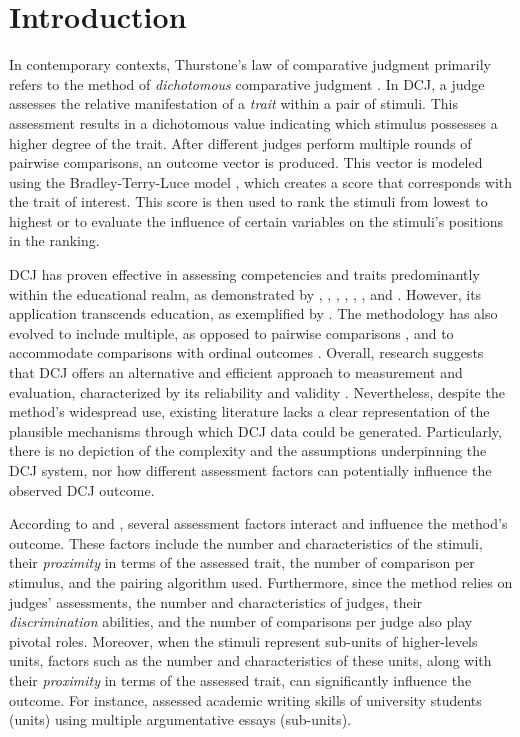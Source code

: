 \documentclass[
  authoryear,
  preprint,
  1p]{elsarticle}
\begin{document}
\section{Introduction}\label{sec-introduction}

In contemporary contexts, Thurstone's law of comparative judgment
\citeyearpar{Thurstone_1927} primarily refers to the method of
\emph{dichotomous} comparative judgment
\citep[DCJ,][]{Pollitt_2012a, Pollitt_2012b}. In DCJ, a judge assesses
the relative manifestation of a \emph{trait} within a pair of stimuli.
This assessment results in a dichotomous value indicating which stimulus
possesses a higher degree of the trait. After different judges perform
multiple rounds of pairwise comparisons, an outcome vector is produced.
This vector is modeled using the Bradley-Terry-Luce model
\citep[BTL,][]{Bradley_et_al_1952, Luce_1959}, which creates a score
that corresponds with the trait of interest. This score is then used to
rank the stimuli from lowest to highest or to evaluate the influence of
certain variables on the stimuli's positions in the ranking.

DCJ has proven effective in assessing competencies and traits
predominantly within the educational realm, as demonstrated by
\citet{Pollitt_2012b}, \citet{Jones_2015}, \citet{vanDaal_et_al_2016},
\citet{Bartholomew_et_al_2018}, \citet{Lesterhuis_2018},
\citet{Bartholomew_et_al_2020}, and \citet{Marshall_et_al_2020}.
However, its application transcends education, as exemplified by
\citet{Boonen_et_al_2020}. The methodology has also evolved to include
multiple, as opposed to pairwise comparisons
\citep{Luce_1959, Placket_1975}, and to accommodate comparisons with
ordinal outcomes \citep{Tutz_1986, Agresti_1992}. Overall, research
suggests that DCJ offers an alternative and efficient approach to
measurement and evaluation, characterized by its reliability and
validity
\citep{Lesterhuis_2018, vanDaal_2020, Marshall_et_al_2020, Bouwer_et_al_2023}.
Nevertheless, despite the method's widespread use, existing literature
lacks a clear representation of the plausible mechanisms through which
DCJ data could be generated. Particularly, there is no depiction of the
complexity and the assumptions underpinning the DCJ system, nor how
different assessment factors can potentially influence the observed DCJ
outcome.

According to \citet{Verhavert_et_al_2019} and \citet{vanDaal_2020},
several assessment factors interact and influence the method's outcome.
These factors include the number and characteristics of the stimuli,
their \emph{proximity} in terms of the assessed trait, the number of
comparison per stimulus, and the pairing algorithm used. Furthermore,
since the method relies on judges' assessments, the number and
characteristics of judges, their \emph{discrimination} abilities, and
the number of comparisons per judge also play pivotal roles. Moreover,
when the stimuli represent sub-units of higher-levels units, factors
such as the number and characteristics of these units, along with their
\emph{proximity} in terms of the assessed trait, can significantly
influence the outcome. For instance, \citet{vanDaal_et_al_2016} assessed
academic writing skills of university students (units) using multiple
argumentative essays (sub-units).
\end{document}
